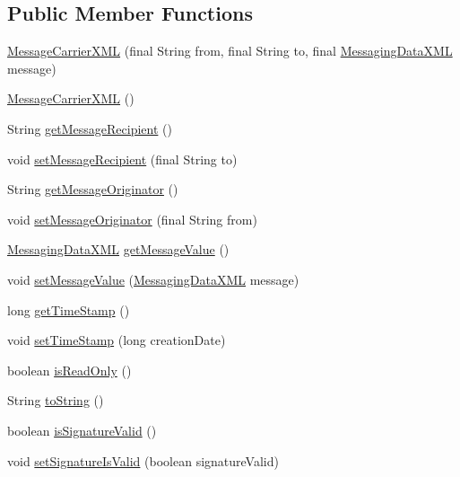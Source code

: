 \subsection*{Public Member Functions}
\begin{DoxyCompactItemize}
\item 
\hyperlink{classgov_1_1fnal_1_1ppd_1_1dd_1_1xml_1_1MessageCarrierXML_afa8a6a3c8d64acc6995ee90573c876a4}{Message\-Carrier\-X\-M\-L} (final String from, final String to, final \hyperlink{classgov_1_1fnal_1_1ppd_1_1dd_1_1xml_1_1MessagingDataXML}{Messaging\-Data\-X\-M\-L} message)
\item 
\hyperlink{classgov_1_1fnal_1_1ppd_1_1dd_1_1xml_1_1MessageCarrierXML_a318a843f4c46e8045e4545037d330eb3}{Message\-Carrier\-X\-M\-L} ()
\item 
String \hyperlink{classgov_1_1fnal_1_1ppd_1_1dd_1_1xml_1_1MessageCarrierXML_af46fdc989fa42e3371cb942a3394b945}{get\-Message\-Recipient} ()
\item 
void \hyperlink{classgov_1_1fnal_1_1ppd_1_1dd_1_1xml_1_1MessageCarrierXML_ad5cdc5a1a35c6d7af057292f4d5d92bd}{set\-Message\-Recipient} (final String to)
\item 
String \hyperlink{classgov_1_1fnal_1_1ppd_1_1dd_1_1xml_1_1MessageCarrierXML_a639740ab8bc6c5f1c45da4303dcbef74}{get\-Message\-Originator} ()
\item 
void \hyperlink{classgov_1_1fnal_1_1ppd_1_1dd_1_1xml_1_1MessageCarrierXML_ab74e97e9fb8c1776e318a76e5ed4123a}{set\-Message\-Originator} (final String from)
\item 
\hyperlink{classgov_1_1fnal_1_1ppd_1_1dd_1_1xml_1_1MessagingDataXML}{Messaging\-Data\-X\-M\-L} \hyperlink{classgov_1_1fnal_1_1ppd_1_1dd_1_1xml_1_1MessageCarrierXML_acd02da5d8151d98e634df355e0525d00}{get\-Message\-Value} ()
\item 
void \hyperlink{classgov_1_1fnal_1_1ppd_1_1dd_1_1xml_1_1MessageCarrierXML_afc625c4a225f08d1baf0774a1fbf6f3f}{set\-Message\-Value} (\hyperlink{classgov_1_1fnal_1_1ppd_1_1dd_1_1xml_1_1MessagingDataXML}{Messaging\-Data\-X\-M\-L} message)
\item 
long \hyperlink{classgov_1_1fnal_1_1ppd_1_1dd_1_1xml_1_1MessageCarrierXML_afcee2a687bc16e7b95d60a91c223dd0b}{get\-Time\-Stamp} ()
\item 
void \hyperlink{classgov_1_1fnal_1_1ppd_1_1dd_1_1xml_1_1MessageCarrierXML_a50d2114c07e7a2a365c31b73951cb588}{set\-Time\-Stamp} (long creation\-Date)
\item 
boolean \hyperlink{classgov_1_1fnal_1_1ppd_1_1dd_1_1xml_1_1MessageCarrierXML_a9ab80285c3975daf5032897069ed0b80}{is\-Read\-Only} ()
\item 
String \hyperlink{classgov_1_1fnal_1_1ppd_1_1dd_1_1xml_1_1MessageCarrierXML_aac248673a922f122741b65cf13256d09}{to\-String} ()
\item 
boolean \hyperlink{classgov_1_1fnal_1_1ppd_1_1dd_1_1xml_1_1MessageCarrierXML_a1b006e6ae04358ab235244fe4a4fbfdf}{is\-Signature\-Valid} ()
\item 
void \hyperlink{classgov_1_1fnal_1_1ppd_1_1dd_1_1xml_1_1MessageCarrierXML_a6cd1a482f78df719511628ba268bcba9}{set\-Signature\-Is\-Valid} (boolean signature\-Valid)
\end{DoxyCompactItemize}
